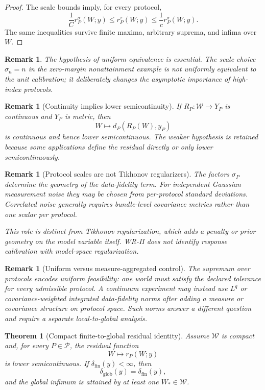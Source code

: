 \documentclass[11pt]{article}
\newtheorem{theorem}[definition]{Theorem}
\newtheorem{remark}[definition]{Remark}
\newcommand{\W}{\mathcal W}
\newcommand{\Pcal}{\mathcal P}
\begin{document}
\begin{proof}
The scale bounds imply, for every protocol,
\[
\frac1C r_P^\sigma(W;y)
\le
r_P^\tau(W;y)
\le
\frac1c r_P^\sigma(W;y).
\]
The same inequalities survive finite maxima, arbitrary suprema, and infima over
$W$.
\end{proof}

\begin{remark}
The hypothesis of uniform equivalence is essential. The scale choice
$\sigma_n=n$ in the zero-margin nonattainment example is not uniformly
equivalent to the unit calibration; it deliberately changes the asymptotic
importance of high-index protocols.
\end{remark}


\begin{remark}[Continuity implies lower semicontinuity]
If $R_P:\W\to Y_P$ is continuous and $Y_P$ is metric, then
\[
W\longmapsto d_P(R_P(W),y_P)
\]
is continuous and hence lower semicontinuous. The weaker hypothesis is retained
because some applications define the residual directly or only lower
semicontinuously.
\end{remark}

\begin{remark}[Protocol scales are not Tikhonov regularizers]
The factors $\sigma_P$ determine the geometry of the data-fidelity term. For
independent Gaussian measurement noise they may be chosen from per-protocol
standard deviations. Correlated noise generally requires bundle-level
covariance metrics rather than one scalar per protocol.

This role is distinct from Tikhonov regularization, which adds a penalty or
prior geometry on the model variable itself. WR-II does not identify response
calibration with model-space regularization.
\end{remark}

\begin{remark}[Uniform versus measure-aggregated control]
The supremum over protocols encodes uniform feasibility: one world must satisfy
the declared tolerance for every admissible protocol. A continuum experiment
may instead use $L^q$ or covariance-weighted integrated data-fidelity norms
after adding a measure or covariance structure on protocol space. Such norms
answer a different question and require a separate local-to-global analysis.
\end{remark}

\begin{theorem}[Compact finite-to-global residual identity]
\label{thm:robust-compact}
Assume $\W$ is compact and, for every $P\in\Pcal$, the residual function
\[
W\longmapsto r_P(W;y)
\]
is lower semicontinuous. If $\delta_{\mathrm{fin}}(y)<\infty$, then
\[
\delta_{\mathrm{glob}}(y)
=
\delta_{\mathrm{fin}}(y),
\]
and the global infimum is attained by at least one $W_\ast\in\W$.
\end{theorem}
\end{document}
